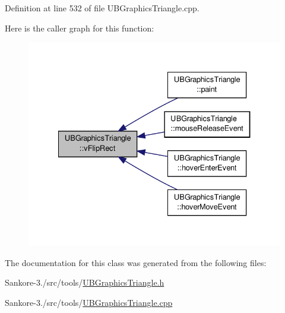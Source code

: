 Definition at line 532 of file U\-B\-Graphics\-Triangle.\-cpp.



Here is the caller graph for this function\-:
\nopagebreak
\begin{figure}[H]
\begin{center}
\leavevmode
\includegraphics[width=334pt]{da/dd0/class_u_b_graphics_triangle_a7ccf8132bbd0649e94dc8a1d3968f19e_icgraph}
\end{center}
\end{figure}




The documentation for this class was generated from the following files\-:\begin{DoxyCompactItemize}
\item 
Sankore-\/3./src/tools/\hyperlink{_u_b_graphics_triangle_8h}{U\-B\-Graphics\-Triangle.\-h}\item 
Sankore-\/3./src/tools/\hyperlink{_u_b_graphics_triangle_8cpp}{U\-B\-Graphics\-Triangle.\-cpp}\end{DoxyCompactItemize}

